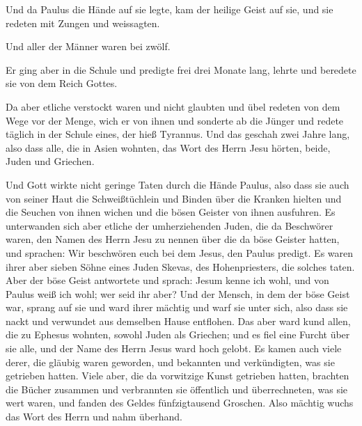  Und da Paulus die Hände auf sie legte, kam der heilige
Geist auf sie, und sie redeten mit Zungen und weissagten.

 Und aller der Männer waren bei zwölf.

 Er ging aber in die Schule und predigte frei drei Monate
lang, lehrte und beredete sie von dem Reich Gottes.

 Da aber etliche verstockt waren und nicht glaubten und
übel redeten von dem Wege vor der Menge, wich er von ihnen und sonderte
ab die Jünger und redete täglich in der Schule eines, der hieß Tyrannus.
 Und das geschah zwei Jahre lang, also dass alle, die in
Asien wohnten, das Wort des Herrn Jesu hörten, beide, Juden und
Griechen.

 Und Gott wirkte nicht geringe Taten durch die Hände
Paulus,  also dass sie auch von seiner Haut die
Schweißtüchlein und Binden über die Kranken hielten und die Seuchen von
ihnen wichen und die bösen Geister von ihnen ausfuhren. 
Es unterwanden sich aber etliche der umherziehenden Juden, die da
Beschwörer waren, den Namen des Herrn Jesu zu nennen über die da böse
Geister hatten, und sprachen: Wir beschwören euch bei dem Jesus, den
Paulus predigt.  Es waren ihrer aber sieben Söhne eines
Juden Skevas, des Hohenpriesters, die solches taten. 
Aber der böse Geist antwortete und sprach: Jesum kenne ich wohl, und von
Paulus weiß ich wohl; wer seid ihr aber?  Und der Mensch,
in dem der böse Geist war, sprang auf sie und ward ihrer mächtig und
warf sie unter sich, also dass sie nackt und verwundet aus demselben
Hause entflohen.  Das aber ward kund allen, die zu
Ephesus wohnten, sowohl Juden als Griechen; und es fiel eine Furcht über
sie alle, und der Name des Herrn Jesus ward hoch gelobt. 
Es kamen auch viele derer, die gläubig waren geworden, und bekannten und
verkündigten, was sie getrieben hatten.  Viele aber, die
da vorwitzige Kunst getrieben hatten, brachten die Bücher zusammen und
verbrannten sie öffentlich und überrechneten, was sie wert waren, und
fanden des Geldes fünfzigtausend Groschen.  Also mächtig
wuchs das Wort des Herrn und nahm überhand.

